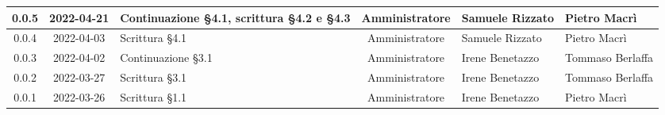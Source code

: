 \begin{center}
\begin{longtable}{ |c|c|p{8em}|c|m{5em}|m{6em}| }
	\hline
	0.0.5 & 2022-04-21 & Continuazione §4.1, scrittura §4.2 e §4.3 & Amministratore & Samuele \newline Rizzato & Pietro \newline Macrì\\
	\hline
	0.0.4 & 2022-04-03 & Scrittura §4.1 & Amministratore & Samuele \newline Rizzato & Pietro \newline Macrì\\
	\hline
	0.0.3 & 2022-04-02 & Continuazione §3.1 & Amministratore & Irene \newline Benetazzo & Tommaso \newline Berlaffa \\
	\hline
	0.0.2 & 2022-03-27 & Scrittura §3.1 & Amministratore & Irene \newline Benetazzo & Tommaso \newline Berlaffa \\
	\hline
	0.0.1 & 2022-03-26 & Scrittura §1.1 & Amministratore & Irene \newline Benetazzo & Pietro \newline Macrì \\
	\hline
	\end{longtable}
	\end{center}
	\newpage